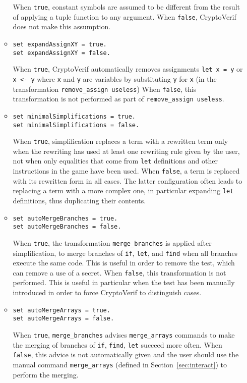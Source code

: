 \begin{itemize}
\begin{itemize}
When {\tt true}, constant symbols are assumed to be different from the
result of applying a tuple function to any argument. When {\tt false},
CryptoVerif does not make this assumption.

\item \texttt{set expandAssignXY = true.}\\
\texttt{set expandAssignXY = false.}

When {\tt true}, CryptoVerif automatically removes assignments 
{\tt let x = y} or {\tt x <- y}
where {\tt x} and {\tt y} are variables by substituting {\tt y} for {\tt x}
(in the transformation {\tt remove\string_assign useless})
When {\tt false}, this transformation is not performed as part of
{\tt remove\string_assign useless}.

\item \texttt{set minimalSimplifications = true.}\\
\texttt{set minimalSimplifications = false.}

When {\tt true}, simplification replaces a term with a rewritten term
only when the rewriting has used at least one rewriting rule given
by the user, not when only equalities that come from {\tt let} definitions
and other instructions in the game have been used.
When {\tt false}, a term is replaced with its rewritten form in
all cases. The latter configuration often leads to replacing
a term with a more complex one, in particular expanding {\tt let}
definitions, thus duplicating their contents.

\item \texttt{set autoMergeBranches = true.}\\
\texttt{set autoMergeBranches = false.}

When {\tt true}, the transformation {\tt merge\_branches} is applied
after simplification, to merge branches of {\tt if}, {\tt let},
and {\tt find} when all branches execute the same code.
This is useful in order to remove the test, which can remove
a use of a secret.
When {\tt false}, this transformation is not performed. 
This is useful in particular when the test has been
manually introduced in order to force CryptoVerif to
distinguish cases.

\item \texttt{set autoMergeArrays = true.}\\
\texttt{set autoMergeArrays = false.}

When {\tt true}, {\tt merge\_branches} advises {\tt merge\_arrays} commands
to make the merging of branches of {\tt if}, {\tt find}, {\tt let}
succeed more often. When {\tt false}, this advice is not
automatically given and the user should use the manual command
{\tt merge\_arrays} (defined in 
Section~\ref{sec:interact}) to perform the merging.


\end{itemize}
\end{itemize}
